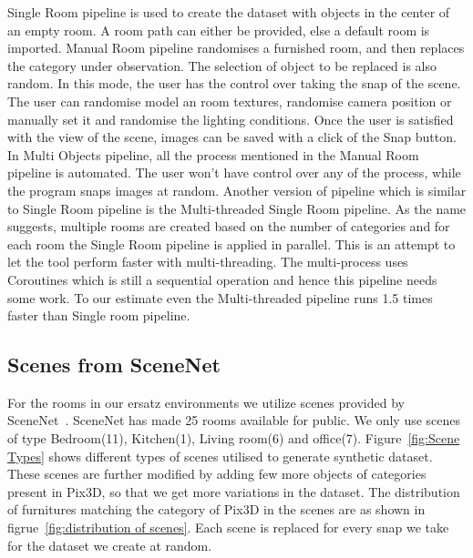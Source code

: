 Single Room pipeline is used to create the dataset with objects in the center of an empty room.
A room path can either be provided, else a default room is imported.
Manual Room pipeline randomises a furnished room, and then replaces the category under observation.
The selection of object to be replaced is also random.
In this mode, the user has the control over taking the snap of the scene.
The user can randomise model an room textures, randomise camera position or manually set it and randomise the lighting conditions.
Once the user is satisfied with the view of the scene, images can be saved with a click of the Snap button.
In Multi Objects pipeline, all the process mentioned in the Manual Room pipeline is automated.
The user won't have control over any of the process, while the program snaps images at random.
Another version of pipeline which is similar to Single Room pipeline is the Multi-threaded Single Room pipeline.
As the name suggests, multiple rooms are created based on the number of categories and for each room the Single Room pipeline is applied in parallel.
This is an attempt to let the tool perform faster with multi-threading.
The multi-process uses Coroutines which is still a sequential operation and hence this pipeline needs some work.
To our estimate even the Multi-threaded pipeline runs 1.5 times faster than Single room pipeline.

\subsection{Scenes from SceneNet}\label{subsec:scenes-from-scenenet}
For the rooms in our ersatz environments we utilize scenes provided by SceneNet~\cite{McCormac:etal:ICCV2017}.
SceneNet has made 25 rooms available for public.
We only use scenes of type Bedroom(11), Kitchen(1), Living room(6) and office(7).
Figure~\ref{fig:Scene Types} shows different types of scenes utilised to generate synthetic dataset.
These scenes are further modified by adding few more objects of categories present in Pix3D, so that we get more variations in the dataset.
The distribution of furnitures matching the category of Pix3D in the scenes are as shown in figrue~\ref{fig:distribution of scenes}.
Each scene is replaced for every snap we take for the dataset we create at random.

